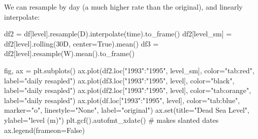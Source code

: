 \documentclass[
  letterpaper,
  DIV=11,
  numbers=noendperiod,
  oneside]{scrreprt}
\newenvironment{Shaded}{\begin{snugshade}}{\end{snugshade}}
\newcommand{\BuiltInTok}[1]{\textcolor[rgb]{0.00,0.23,0.31}{#1}}
\newcommand{\CommentTok}[1]{\textcolor[rgb]{0.37,0.37,0.37}{#1}}
\newcommand{\NormalTok}[1]{\textcolor[rgb]{0.00,0.23,0.31}{#1}}
\newcommand{\OperatorTok}[1]{\textcolor[rgb]{0.37,0.37,0.37}{#1}}
\newcommand{\StringTok}[1]{\textcolor[rgb]{0.13,0.47,0.30}{#1}}
\newcommand{\VariableTok}[1]{\textcolor[rgb]{0.07,0.07,0.07}{#1}}
\begin{document}
We can resample by day (a much higher rate than the original), and
linearly interpolate:

\begin{Shaded}
\begin{Highlighting}[]
\NormalTok{df2 }\OperatorTok{=}\NormalTok{ df[}\StringTok{\textquotesingle{}level\textquotesingle{}}\NormalTok{].resample(}\StringTok{\textquotesingle{}D\textquotesingle{}}\NormalTok{).interpolate(}\StringTok{\textquotesingle{}time\textquotesingle{}}\NormalTok{).to\_frame()}
\NormalTok{df2[}\StringTok{\textquotesingle{}level\_sm\textquotesingle{}}\NormalTok{] }\OperatorTok{=}\NormalTok{ df2[}\StringTok{\textquotesingle{}level\textquotesingle{}}\NormalTok{].rolling(}\StringTok{\textquotesingle{}30D\textquotesingle{}}\NormalTok{, center}\OperatorTok{=}\VariableTok{True}\NormalTok{).mean()}
\NormalTok{df3 }\OperatorTok{=}\NormalTok{ df2[}\StringTok{\textquotesingle{}level\textquotesingle{}}\NormalTok{].resample(}\StringTok{\textquotesingle{}W\textquotesingle{}}\NormalTok{).mean().to\_frame()}
\end{Highlighting}
\end{Shaded}

\begin{Shaded}
\begin{Highlighting}[]
\NormalTok{fig, ax }\OperatorTok{=}\NormalTok{ plt.subplots()}
\NormalTok{ax.plot(df2.loc[}\StringTok{"1993"}\NormalTok{:}\StringTok{"1995"}\NormalTok{, }\StringTok{\textquotesingle{}level\_sm\textquotesingle{}}\NormalTok{],}
\NormalTok{        color}\OperatorTok{=}\StringTok{"tab:red"}\NormalTok{,}
\NormalTok{        label}\OperatorTok{=}\StringTok{"daily resapled"}\NormalTok{)}
\NormalTok{ax.plot(df3.loc[}\StringTok{"1993"}\NormalTok{:}\StringTok{"1995"}\NormalTok{, }\StringTok{\textquotesingle{}level\textquotesingle{}}\NormalTok{],}
\NormalTok{        color}\OperatorTok{=}\StringTok{"black"}\NormalTok{,}
\NormalTok{        label}\OperatorTok{=}\StringTok{"daily resapled"}\NormalTok{)}
\NormalTok{ax.plot(df2.loc[}\StringTok{"1993"}\NormalTok{:}\StringTok{"1995"}\NormalTok{, }\StringTok{\textquotesingle{}level\textquotesingle{}}\NormalTok{],}
\NormalTok{        color}\OperatorTok{=}\StringTok{"tab:orange"}\NormalTok{,}
\NormalTok{        label}\OperatorTok{=}\StringTok{"daily resapled"}\NormalTok{)}
\NormalTok{ax.plot(df.loc[}\StringTok{"1993"}\NormalTok{:}\StringTok{"1995"}\NormalTok{, }\StringTok{\textquotesingle{}level\textquotesingle{}}\NormalTok{],}
\NormalTok{        color}\OperatorTok{=}\StringTok{"tab:blue"}\NormalTok{,}
\NormalTok{        marker}\OperatorTok{=}\StringTok{"o"}\NormalTok{,}
\NormalTok{        linestyle}\OperatorTok{=}\StringTok{"None"}\NormalTok{,}
\NormalTok{        label}\OperatorTok{=}\StringTok{"original"}\NormalTok{)}
\NormalTok{ax.}\BuiltInTok{set}\NormalTok{(title}\OperatorTok{=}\StringTok{"Dead Sea Level"}\NormalTok{,}
\NormalTok{       ylabel}\OperatorTok{=}\StringTok{"level (m)"}\NormalTok{)}
\NormalTok{plt.gcf().autofmt\_xdate()  }\CommentTok{\# makes slanted dates}
\NormalTok{ax.legend(frameon}\OperatorTok{=}\VariableTok{False}\NormalTok{)}
\end{Highlighting}
\end{Shaded}
\end{document}
